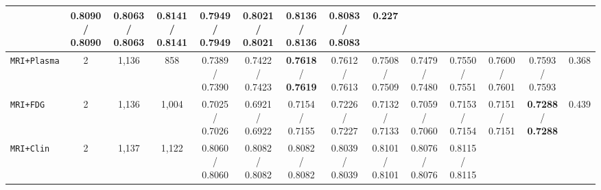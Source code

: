 \documentclass[10pt,twocolumn]{article}
\begin{document}
\begin{table}[t]
{\begin{tabular}{@{}>{\raggedright\arraybackslash}p{2.65cm}ccccccccccccc@{}}
{/\\0.8024} & \shortstack{0.8090 /\\0.8090} & \shortstack{0.8063 /\\0.8063} &
\shortstack{\textbf{0.8141} /\\\textbf{0.8141}} & \shortstack{0.7949 /\\0.7949} &
\shortstack{0.8021 /\\0.8021} & \shortstack{0.8136 /\\0.8136} &
\shortstack{0.8083 /\\0.8083} & 0.227 \\
\midrule
\texttt{MRI+Plasma} & 2 & 1,136 & 858 & \shortstack{0.7389 /\\0.7390} & \shortstack{0.7422
/\\0.7423} & \shortstack{\textbf{0.7618} /\\\textbf{0.7619}} & \shortstack{0.7612 /\\0.7613} &
\shortstack{0.7508 /\\0.7509} & \shortstack{0.7479 /\\0.7480} & \shortstack{0.7550 /\\0.7551} &
\shortstack{0.7600 /\\0.7601} & \shortstack{0.7593 /\\0.7593} & 0.368 \\
\texttt{MRI+FDG} & 2 & 1,136 & 1,004 & \shortstack{0.7025 /\\0.7026} & \shortstack{0.6921
/\\0.6922} & \shortstack{0.7154 /\\0.7155} & \shortstack{0.7226 /\\0.7227} & \shortstack{0.7132
/\\0.7133} & \shortstack{0.7059 /\\0.7060} & \shortstack{0.7153 /\\0.7154} &
\shortstack{0.7151 /\\0.7151} & \shortstack{\textbf{0.7288} /\\\textbf{0.7288}} & 0.439 \\
\texttt{MRI+Clin} & 2 & 1,137 & 1,122 & \shortstack{0.8060 /\\0.8060} & \shortstack{0.8082
/\\0.8082} & \shortstack{0.8082 /\\0.8082} & \shortstack{0.8039 /\\0.8039} & \shortstack{0.8101
/\\0.8101} & \shortstack{0.8076 /\\0.8076} & \shortstack{0.8115 /\\0.8115} &

\end{tabular}}
\end{table}
\end{document}
